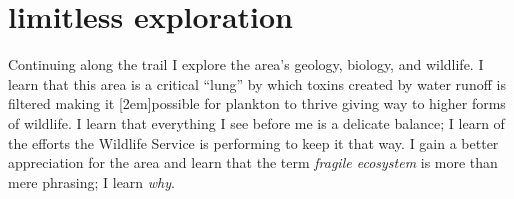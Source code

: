 \section{limitless exploration}
Continuing along the trail I explore the area's geology, biology, and
wildlife. 
I learn that this area is a critical ``lung'' by which toxins created by water 
runoff is filtered making it
[2em]possible for plankton to thrive giving way to higher forms of wildlife. I learn
that everything I see before me is a delicate balance; I learn of the efforts the
Wildlife Service is performing to keep it that way. I gain a better appreciation
for the area and learn that the term \emph{fragile ecosystem} is more than
mere phrasing; I learn \emph{why}.

